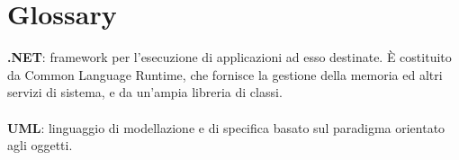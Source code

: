 
\chapter{Glossary}
\textbf{.NET}: framework per l'esecuzione di applicazioni ad esso destinate. È costituito da Common Language Runtime, che fornisce la gestione della memoria ed altri servizi di sistema, e da un'ampia libreria di classi. \\\\
\textbf{UML}: linguaggio di modellazione e di specifica basato sul paradigma orientato agli oggetti.



